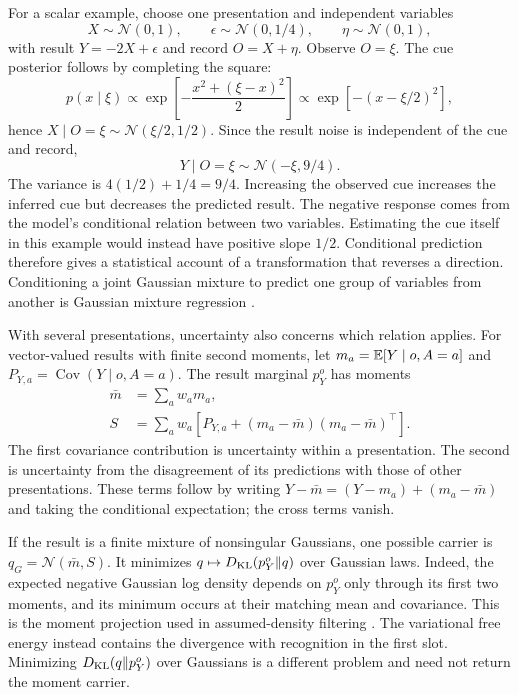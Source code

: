 For a scalar example, choose one presentation and independent variables
\begin{equation}
X\sim\mathcal N(0,1),\qquad
\epsilon\sim\mathcal N(0,1/4),\qquad
\eta\sim\mathcal N(0,1),
\end{equation}
with result $Y=-2X+\epsilon$ and record $O=X+\eta$. Observe $O=\xi$. The cue posterior follows by completing the square:
\begin{equation}
p(x\mid\xi)\propto
\exp\left[-\frac{x^2+(\xi-x)^2}{2}\right]
\propto\exp[-(x-\xi/2)^2],
\end{equation}
hence $X\mid O=\xi\sim\mathcal N(\xi/2,1/2)$. Since the result noise is independent of the cue and record,
\begin{equation}
Y\mid O=\xi\sim\mathcal N(-\xi,9/4).
\label{comp:eq-negative-result}
\end{equation}
The variance is $4(1/2)+1/4=9/4$. Increasing the observed cue increases the inferred cue but decreases the predicted result. The negative response comes from the model's conditional relation between two variables. Estimating the cue itself in this example would instead have positive slope $1/2$. Conditional prediction therefore gives a statistical account of a transformation that reverses a direction. Conditioning a joint Gaussian mixture to predict one group of variables from another is Gaussian mixture regression \citep{Calinon2016}.

With several presentations, uncertainty also concerns which relation applies. For vector-valued results with finite second moments, let $m_a=\mathbb E[Y\mid o,A=a]$ and $P_{Y,a}=\operatorname{Cov}(Y\mid o,A=a)$. The result marginal $p_Y^o$ has moments
\begin{equation}
\begin{aligned}
\bar m&=\sum_a w_am_a,\\
S&=\sum_a w_a\left[P_{Y,a}+(m_a-\bar m)(m_a-\bar m)^\top\right].
\end{aligned}
\label{comp:eq-result-ambiguity}
\end{equation}
The first covariance contribution is uncertainty within a presentation. The second is uncertainty from the disagreement of its predictions with those of other presentations. These terms follow by writing $Y-\bar m=(Y-m_a)+(m_a-\bar m)$ and taking the conditional expectation; the cross terms vanish.

If the result is a finite mixture of nonsingular Gaussians, one possible carrier is $q_G=\mathcal N(\bar m,S)$. It minimizes $q\mapsto D_{\mathrm{KL}}(p_Y^o\Vert q)$ over Gaussian laws. Indeed, the expected negative Gaussian log density depends on $p_Y^o$ only through its first two moments, and its minimum occurs at their matching mean and covariance. This is the moment projection used in assumed-density filtering \citep{Minka2001EP}. The variational free energy instead contains the divergence with recognition in the first slot. Minimizing $D_{\mathrm{KL}}(q\Vert p_Y^o)$ over Gaussians is a different problem and need not return the moment carrier.

